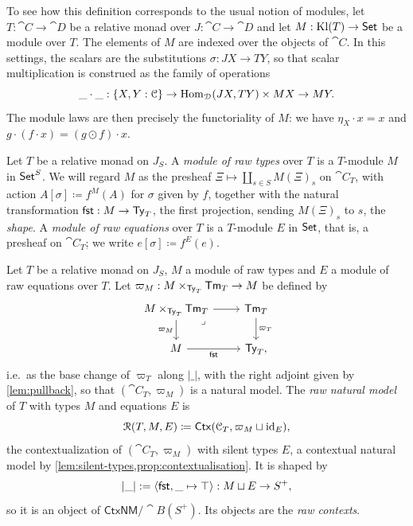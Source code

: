 \begin{remark}
    To see how this definition corresponds to the usual notion of modules, let $T : \cat{C} \to \cat{D}$ be a relative monad over $J : \cat{C} \to \cat{D}$ and let $M : \mathrm{Kl}(T) \to \mathsf{Set}$ be a module over $T$. The elements of $M$ are indexed over the objects of $\cat{C}$. In this settings, the scalars are the substitutions $\sigma : JX \to TY$, so that scalar multiplication is construed as the family of operations
    $$\_\cdot\_ : \{X,Y : \mathcal{C}\} \to \operatorname{Hom}_{\mathcal{D}}(JX,TY) \times MX \to MY.$$
    The module laws are then precisely the functoriality of $M$: we have $\eta_X\cdot x = x$ and $g \cdot (f \cdot x) = (g \odot f) \cdot x$. 
\end{remark}

\begin{definition}\label{def:raw-types}
    Let $T$ be a relative monad on $J_S$. A \emph{module of raw types} over $T$ is a $T$-module $M$ in $\mathsf{Set}^S$. We will regard $M$ as the presheaf $\Xi \mapsto \coprod_{s \in S} M(\Xi)_s$ on $\cat{C}_T$, with action $A[\sigma] \coloneqq f^M(A)$ for $\sigma$ given by $f$, together with the natural transformation $\mathsf{fst} : M \to \mathsf{Ty}_T$, the first projection, sending $M(\Xi)_s$ to $s$, the \emph{shape}. A \emph{module of raw equations} over $T$ is a $T$-module $E$ in $\mathsf{Set}$, that is, a presheaf on $\cat{C}_T$; we write $e[\sigma] \coloneqq f^E(e)$.
\end{definition}

\begin{definition}\label{def:raw-natural-model}
    Let $T$ be a relative monad on $J_S$, $M$ a module of raw types and $E$ a module of raw equations over $T$. Let $\varpi_M : M \times_{\mathsf{Ty}_T} \mathsf{Tm}_T \to M$ be defined by
    \[\begin{tikzcd}
    	{M\times_{\Ty_T}\Tm_T} & {\Tm_T} \\
    	M & {\Ty_T},
    	\arrow[from=1-1, to=1-2]
    	\arrow["{\varpi_M}"', from=1-1, to=2-1]
    	\arrow["\lrcorner"{anchor=center, pos=0.125}, draw=none, from=1-1, to=2-2]
    	\arrow["{\varpi_T}", from=1-2, to=2-2]
    	\arrow["{\fst}"', from=2-1, to=2-2]
    \end{tikzcd}\]
    i.e.\ as the base change of $\varpi_T$ along $|\_|$, with the right adjoint given by \cref{lem:pullback}, so that $(\cat{C}_T, \varpi_M)$ is a natural model. The \emph{raw natural model} of $T$ with types $M$ and equations $E$ is
    \[
        \mathcal{R}(T, M, E) \coloneqq \mathsf{Ctx}(\mathcal{C}_T, \varpi_M \sqcup \mathrm{id}_E),
    \]
    the contextualization of $(\cat{C}_T, \varpi_M)$ with silent types $E$, a contextual natural model by \cref{lem:silent-types,prop:contextualisation}. It is shaped by
    $$|\_| := \left<\mathsf{fst}, \_ \mapsto \top\right> : M \sqcup E \to S^+,$$
    so it is an object of $\mathsf{CtxNM}/\cat{B}(S^+)$. Its objects are the \emph{raw contexts}.
\end{definition}

